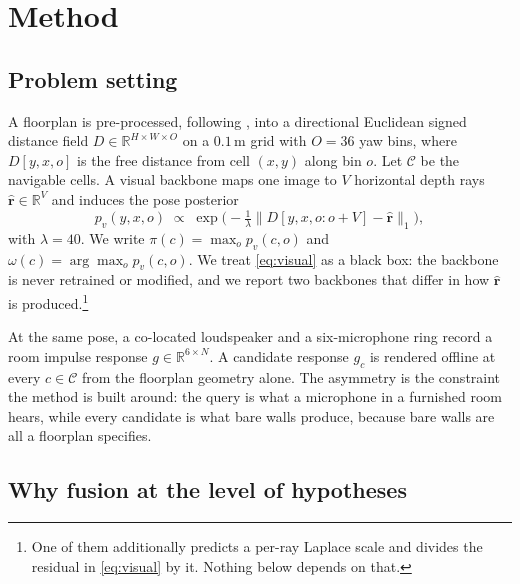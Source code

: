 
\section{Method}
\label{sec:method}

\subsection{Problem setting}
\label{sec:setup}

A floorplan is pre-processed, following \cite{f3loc}, into a directional
Euclidean signed distance field $D \in \mathbb{R}^{H \times W \times O}$ on a
$0.1$\,m grid with $O{=}36$ yaw bins, where $D[y,x,o]$ is the free distance from
cell $(x,y)$ along bin $o$. Let $\mathcal{C}$ be the navigable cells. A visual
backbone maps one image to $V$ horizontal depth rays
$\hat{\mathbf{r}} \in \mathbb{R}^{V}$ and induces the pose posterior
%
\begin{equation}
  p_v(y,x,o) \;\propto\; \exp\!\Big(-\tfrac{1}{\lambda}
  \big\| D[y,x,o{:}o{+}V] - \hat{\mathbf{r}} \big\|_1 \Big),
  \label{eq:visual}
\end{equation}
%
with $\lambda{=}40$. We write $\pi(c) = \max_o p_v(c,o)$ and
$\omega(c) = \arg\max_o p_v(c,o)$. We treat \eqref{eq:visual} as a black box:
the backbone is never retrained or modified, and we report two backbones that
differ in how $\hat{\mathbf{r}}$ is produced.\footnote{One of them additionally
predicts a per-ray Laplace scale and divides the residual in \eqref{eq:visual}
by it. Nothing below depends on that.}

At the same pose, a co-located loudspeaker and a six-microphone ring record a
room impulse response $g \in \mathbb{R}^{6 \times N}$. A candidate response
$g_c$ is rendered offline at every $c \in \mathcal{C}$ from the floorplan
geometry alone. The asymmetry is the constraint the method is built around: the
query is what a microphone in a furnished room hears, while every candidate is
what bare walls produce, because bare walls are all a floorplan specifies.

\subsection{Why fusion at the level of hypotheses}
\label{sec:why}

